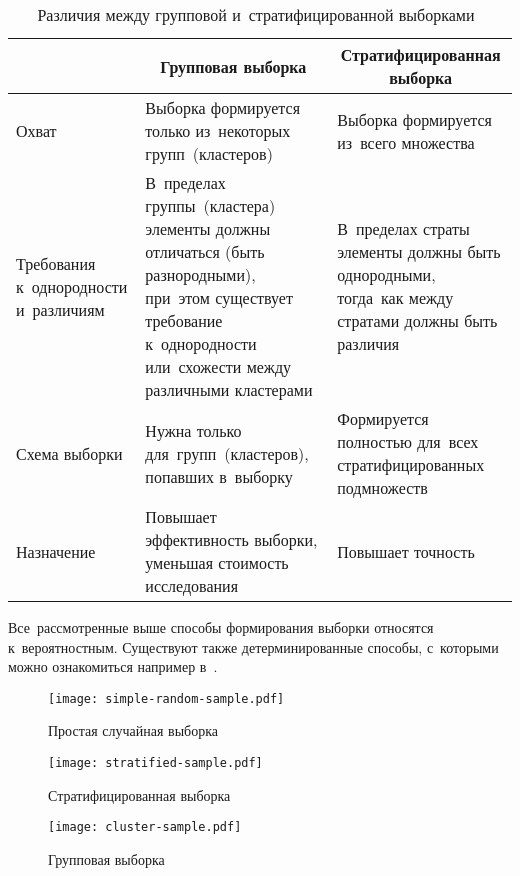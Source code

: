 \documentclass[]{scrartcl}
\begin{document}
\begin{table}[ht]
	\caption{Различия между групповой и~стратифицированной выборками~\cite{Studfile:strat-clust-sample-diff}}  \label{tab:strat-clust-sample-diff}
	\centering%
	\begin{tabularx}{\textwidth}{X|XX} 
		\hline
		\multicolumn{1}{c|}{} & \multicolumn{1}{c}{Групповая выборка} & \multicolumn{1}{c}{Стратифицированная выборка}  \\ 
		\hline\hline
		Охват
		& Выборка формируется только из~некоторых групп~(кластеров)
		& Выборка формируется из~всего множества 
		\\ \hline
		Требования к~однородности и~различиям
		& В~пределах группы~(кластера) элементы должны отличаться (быть разнородными), при~этом существует требование к~однородности или~схожести между различными кластерами  
		& В~пределах страты элементы должны быть однородными, тогда~как между стратами должны быть различия
		\\ \hline
		Схема выборки
		& Нужна только для~групп~(кластеров), попавших в~выборку   
		& Формируется полностью для~всех стратифицированных подмножеств
		\\ \hline
		Назначение
		& Повышает эффективность выборки, уменьшая стоимость исследования  
		& Повышает точность     
		\\ \hline
	\end{tabularx}
\end{table}
Все~рассмотренные выше способы формирования выборки относятся к~вероятностным. Существуют также детерминированные способы, с~которыми можно ознакомиться например в~\cite{FDF:types-of-sampling}.

\begin{figure}[ht]
	\centering %
	\texttt{[image: simple-random-sample.pdf]}
	\caption{Простая случайная выборка}\label{fig:simple-random-sample}
\end{figure}

\begin{figure}[ht]
	\centering %
	\texttt{[image: stratified-sample.pdf]}
	\caption{Стратифицированная выборка}\label{fig:stratified-sample}
\end{figure}

\begin{figure}[ht]
	\centering %
	\texttt{[image: cluster-sample.pdf]}
	\caption{Групповая выборка}\label{fig:cluster-sample}
\end{figure}
\end{document}
